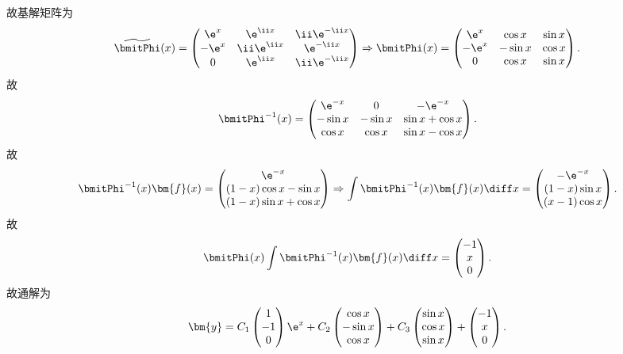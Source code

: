 \begin{solve}
  故基解矩阵为
  \[\widetilde{\bmitPhi}(x) = 
  \begin{pmatrix}
    \e^x&\e^{\ii x}&\ii\e^{-\ii x} \\
    -\e^x&\ii\e^{\ii x}&\e^{-\ii x} \\
    0&\e^{\ii x}&\ii\e^{-\ii x}
  \end{pmatrix}\Rightarrow
  \bmitPhi(x) =
  \begin{pmatrix}
    \e^x&\cos x&\sin x \\
    -\e^x&-\sin x&\cos x \\
    0&\cos x&\sin x
  \end{pmatrix}.\]
  故
  \[\bmitPhi^{-1}(x) =
  \begin{pmatrix}
    \e^{-x}&0&-\e^{-x} \\
    -\sin x&-\sin x&\sin x+\cos x \\
    \cos x&\cos x&\sin x-\cos x
  \end{pmatrix}.\]
  故
  \[\bmitPhi^{-1}(x)\bm{f}(x) =
  \begin{pmatrix}
    \e^{-x} \\
    (1-x)\cos x-\sin x \\
    (1-x)\sin x+\cos x
  \end{pmatrix}\Rightarrow
  \int\bmitPhi^{-1}(x)\bm{f}(x)\diff x =
  \begin{pmatrix}
    -\e^{-x} \\ 
    (1-x)\sin x \\
    (x-1)\cos x
  \end{pmatrix}.\]
  故
  \[\bmitPhi(x)\int\bmitPhi^{-1}(x)\bm{f}(x)\diff x
    = \begin{pmatrix}-1\\x\\0\end{pmatrix}.\]
  故通解为
  \[\bm{y} = C_1\begin{pmatrix}1\\-1\\0\end{pmatrix}\e^x
    + C_2\begin{pmatrix}\cos x\\-\sin x\\\cos x\end{pmatrix}
    + C_3\begin{pmatrix}\sin x\\\cos x\\\sin x\end{pmatrix}
    + \begin{pmatrix}-1\\x\\0\end{pmatrix}.\]


\end{solve}

